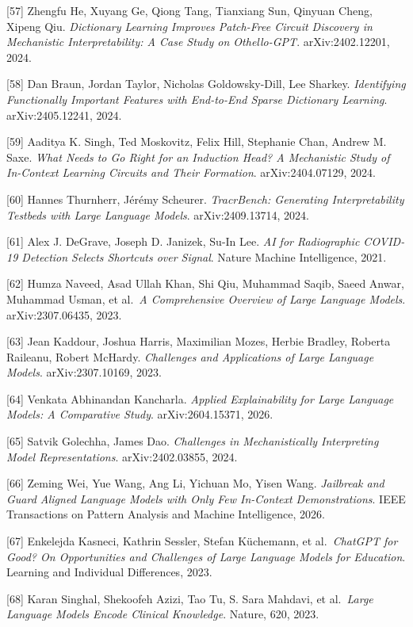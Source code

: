 {[}57{]} Zhengfu He, Xuyang Ge, Qiong Tang, Tianxiang Sun, Qinyuan Cheng, Xipeng Qiu. \emph{Dictionary Learning Improves Patch-Free Circuit Discovery in Mechanistic Interpretability: A Case Study on Othello-GPT}. arXiv:2402.12201, 2024.

{[}58{]} Dan Braun, Jordan Taylor, Nicholas Goldowsky-Dill, Lee Sharkey. \emph{Identifying Functionally Important Features with End-to-End Sparse Dictionary Learning}. arXiv:2405.12241, 2024.

{[}59{]} Aaditya K. Singh, Ted Moskovitz, Felix Hill, Stephanie Chan, Andrew M. Saxe. \emph{What Needs to Go Right for an Induction Head? A Mechanistic Study of In-Context Learning Circuits and Their Formation}. arXiv:2404.07129, 2024.

{[}60{]} Hannes Thurnherr, Jérémy Scheurer. \emph{TracrBench: Generating Interpretability Testbeds with Large Language Models}. arXiv:2409.13714, 2024.

{[}61{]} Alex J. DeGrave, Joseph D. Janizek, Su-In Lee. \emph{AI for Radiographic COVID-19 Detection Selects Shortcuts over Signal}. Nature Machine Intelligence, 2021.

{[}62{]} Humza Naveed, Asad Ullah Khan, Shi Qiu, Muhammad Saqib, Saeed Anwar, Muhammad Usman, et al.~\emph{A Comprehensive Overview of Large Language Models}. arXiv:2307.06435, 2023.

{[}63{]} Jean Kaddour, Joshua Harris, Maximilian Mozes, Herbie Bradley, Roberta Raileanu, Robert McHardy. \emph{Challenges and Applications of Large Language Models}. arXiv:2307.10169, 2023.

{[}64{]} Venkata Abhinandan Kancharla. \emph{Applied Explainability for Large Language Models: A Comparative Study}. arXiv:2604.15371, 2026.

{[}65{]} Satvik Golechha, James Dao. \emph{Challenges in Mechanistically Interpreting Model Representations}. arXiv:2402.03855, 2024.

{[}66{]} Zeming Wei, Yue Wang, Ang Li, Yichuan Mo, Yisen Wang. \emph{Jailbreak and Guard Aligned Language Models with Only Few In-Context Demonstrations}. IEEE Transactions on Pattern Analysis and Machine Intelligence, 2026.

{[}67{]} Enkelejda Kasneci, Kathrin Sessler, Stefan Küchemann, et al.~\emph{ChatGPT for Good? On Opportunities and Challenges of Large Language Models for Education}. Learning and Individual Differences, 2023.

{[}68{]} Karan Singhal, Shekoofeh Azizi, Tao Tu, S. Sara Mahdavi, et al.~\emph{Large Language Models Encode Clinical Knowledge}. Nature, 620, 2023.

